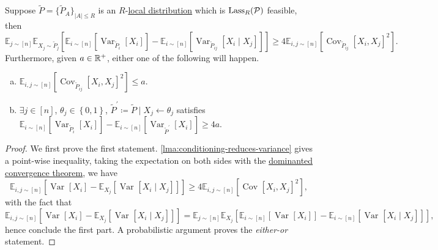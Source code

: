 \begin{corollary}\label{col:lec16}
	Suppose \(\widetilde{P} =\{ \widetilde{P} _A \}_{\left\vert A \right\vert \leq R} \) is an \(R\)-\hyperref[def:local-distribution]{local distribution} which is \(\mathop{\mathrm{Lass}}_R(\mathcal{\MakeUppercase{p}})\) feasible, then
	\[
		\mathbb{E}_{j\sim [n]} \mathbb{E}_{X_j\sim \widetilde{P} _j}\left[ \mathbb{E}_{i\sim [n]}\left[\mathop{\mathrm{Var}}\nolimits_{\widetilde{P} _i}\left[X_i \right]\right] - \mathbb{E}_{i\sim [n]}\left[\mathop{\mathrm{Var}}\nolimits_{\widetilde{P} _{ij}}\left[X_i \mid X_j \right]\right] \right] \geq 4 \mathbb{E}_{i, j\sim [n]}\left[\mathop{\mathrm{Cov}}\nolimits_{\widetilde{P} _{ij}}\left[ X_i, X_j\right]^{2} \right].
	\]
	Furthermore, given \(a\in \mathbb{\MakeUppercase{r}} ^+\), either one of the following will happen.
	\begin{enumerate}[(a)]
		\item \(\mathbb{E}_{i, j\sim [n]}\left[\mathop{\mathrm{Cov}}\nolimits_{\widetilde{P} _{ij}}\left[ X_i, X_j\right]^{2} \right] \leq a\).
		\item \(\exists j\in [n]\), \(\theta _j\in \left\{ 0, 1 \right\} \), \(\widetilde{P} ^\prime \coloneqq \widetilde{P} \mid X_j \gets \theta _j\) satisfies \(\mathbb{E}_{i\sim [n]}\left[\mathop{\mathrm{Var}}\nolimits_{\widetilde{P} _i}\left[X_i \right]\right] - \mathbb{E}_{i\sim [n]}\left[\mathop{\mathrm{Var}}\nolimits_{\widetilde{P}^\prime }\left[X_i \right]\right] \geq 4a\).
	\end{enumerate}
\end{corollary}
\begin{proof}
	We first prove the first statement. \autoref{lma:conditioning-reduces-variance} gives a point-wise inequality, taking the expectation on both sides with the \href{https://en.wikipedia.org/wiki/Dominated_convergence_theorem}{dominanted convergence theorem}, we have
	\[
		\mathbb{E}_{i, j\sim [n]}\left[\mathop{\mathrm{Var}}\nolimits_{}\left[X_i \right] - \mathbb{E}_{X_j}\left[\mathop{\mathrm{Var}}\nolimits_{}\left[X_i \mid X_j \right] \right] \right] \geq 4 \mathbb{E}_{i, j\sim [n]}\left[\mathop{\mathrm{Cov}}\nolimits_{}\left[X_i, X_j \right] ^{2} \right],
	\]
	with the fact that
	\[
		\mathbb{E}_{i, j\sim [n]}\left[\mathop{\mathrm{Var}}\nolimits_{}\left[X_i \right] - \mathbb{E}_{X_j}\left[\mathop{\mathrm{Var}}\nolimits_{}\left[X_i \mid X_j \right] \right] \right] = \mathbb{E}_{j\sim [n]}\mathbb{E}_{X_j}\left[\mathbb{E}_{i\sim [n]}\left[\mathop{\mathrm{Var}}\nolimits_{}\left[X_i \right] \right] - \mathbb{E}_{i\sim [n]}\left[\mathop{\mathrm{Var}}\nolimits_{}\left[X_i\mid X_j \right] \right] \right],
	\]
	hence conclude the first part. A probabilistic argument proves the \emph{either-or} statement.
\end{proof}

